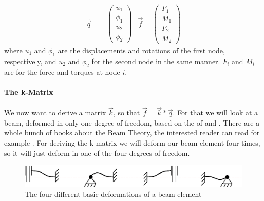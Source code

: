 \begin{align}
\vec{q}&=\left(\begin{array}{c}
u_1 \\ 
\phi_1 \\ 
u_2 \\ 
\phi_2
\end{array} \right)&\vec{f}=\left(\begin{array}{c}
F_1 \\ 
M_1 \\ 
F_2 \\ 
M_2
\end{array}\right)\nonumber
\end{align}
where $u_1$ and $\phi_1$ are the displacements and rotations of the first node, respectively, and  $u_2$ and $\phi_2$ for the second node in the same manner. $F_i$ and $M_i$ are for the force and torques at node $i$.
\bigskip 
\paragraph{The k-Matrix}

We now want to derive a matrix $\vec{k}$, so that $\vec{f}=\vec{k}*\vec{q}$. For that we will look at a beam, deformed in only one degree of freedom, based on the  of  and . There are a whole bunch of books about the Beam Theory, the interested reader can read for example \cite{timoschenko}. For deriving the k-matrix we will deform our beam element four times, so it will just deform in one of the four degrees of freedom.\\
\bigskip
\begin{figure}
\begin{center}
\includegraphics[scale=1.2]{figs/fourDeformations}
\caption{The four different basic deformations of a beam element}
\end{center}
\end{figure}
\bigskip 

